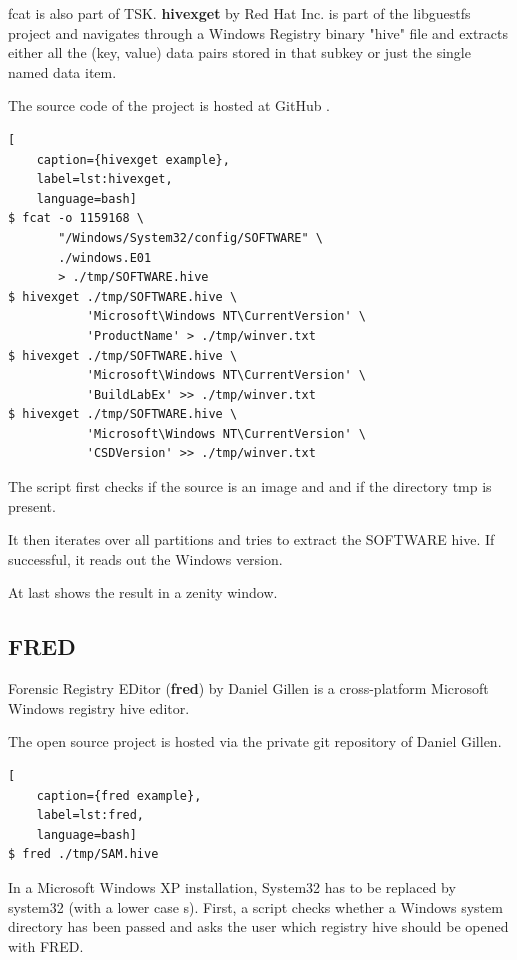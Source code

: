 fcat is also part of TSK.\newline
\newline
\noindent \textbf{hivexget} by Red Hat Inc. is part of the libguestfs project and navigates through a Windows Registry binary "hive" file and extracts either all the (key, value) data pairs stored in that subkey or just the single named data item.

The source code of the project is hosted at GitHub \cite{Libguestfs}.

\begin{lstlisting}[
    caption={hivexget example},
    label=lst:hivexget,
    language=bash]
$ fcat -o 1159168 \
       "/Windows/System32/config/SOFTWARE" \
       ./windows.E01
       > ./tmp/SOFTWARE.hive
$ hivexget ./tmp/SOFTWARE.hive \
           'Microsoft\Windows NT\CurrentVersion' \
           'ProductName' > ./tmp/winver.txt
$ hivexget ./tmp/SOFTWARE.hive \
           'Microsoft\Windows NT\CurrentVersion' \
           'BuildLabEx' >> ./tmp/winver.txt
$ hivexget ./tmp/SOFTWARE.hive \
           'Microsoft\Windows NT\CurrentVersion' \
           'CSDVersion' >> ./tmp/winver.txt
\end{lstlisting}

\noindent The script first checks if the source is an image and and if the directory tmp is present.

It then iterates over all partitions and tries to extract the SOFTWARE hive. If successful, it reads out the Windows version.

At last shows the result in a zenity window.

\subsection{FRED}

Forensic Registry EDitor (\textbf{fred}) by Daniel Gillen is a cross-platform Microsoft Windows registry hive editor.

The open source project is hosted via the private git repository \cite{FRED} of Daniel Gillen.

\begin{lstlisting}[
    caption={fred example},
    label=lst:fred,
    language=bash]
$ fred ./tmp/SAM.hive
\end{lstlisting}

\noindent In a Microsoft Windows XP installation, System32 has to be replaced by system32 (with a lower case s).\newline
\newline
\noindent First, a script checks whether a Windows system directory has been passed and asks the user which registry hive should be opened with FRED.


